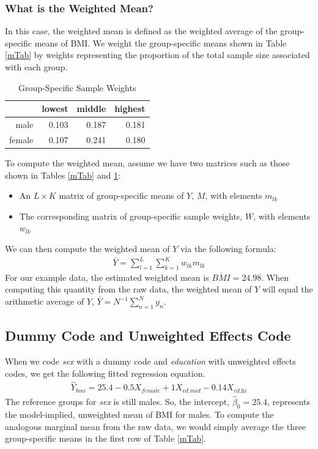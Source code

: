 \documentclass{article}\usepackage[]{graphicx}\usepackage[]{color}
\begin{document}
\subsubsection{What is the Weighted Mean?}
In this case, the weighted mean is defined as the weighted average of the
group-specific means of BMI. We weight the group-specific means shown in Table
\ref{mTab} by weights representing the proportion of the total sample size
associated with each group.

\begin{table}[ht]
\centering
\begin{tabular}{rrrr}
  \toprule
 & lowest & middle & highest \\ 
  \midrule
male & 0.103 & 0.187 & 0.181 \\ 
  female & 0.107 & 0.241 & 0.180 \\ 
   \bottomrule
\end{tabular}
\caption{Group-Specific Sample Weights} 
\label{wTab}
\end{table}


To compute the weighted mean, assume we have two matrices such as those shown in
Tables \ref{mTab} and \ref{wTab}:
\begin{itemize}
\item An $L \times K$ matrix of group-specific means of $Y$, $M$, with elements
  $m_{lk}$
\item The corresponding matrix of group-specific sample weights, $W$, with
  elements $w_{lk}$
\end{itemize}
We can then compute the weighted mean of $Y$ via the following formula:
\begin{align*}
  \bar{Y} = \sum_{l = 1}^L \sum_{k = 1}^K w_{lk} m_{lk}
\end{align*}
For our example data, the estimated weighted mean is $\overline{\textit{BMI}} =
24.98$. When computing this quantity from the raw
data, the weighted mean of $Y$ will equal the arithmetic average of $Y$,
$\bar{Y} = N^{-1} \sum_{n = 1}^N y_n$.

\subsection{Dummy Code and Unweighted Effects Code}



When we code \emph{sex} with a dummy code and \emph{education} with unweighted
effects codes, we get the following fitted regression equation.
\begin{align*}
  \hat{Y}_{\textit{bmi}} = 
  25.4
  -0.5X_{\textit{female}} + 
  1X_{\textit{ed.mid}} 
  -0.14X_{\textit{ed.hi}}
\end{align*}
The reference groups for \emph{sex} is still males. So, the intercept,
$\hat{\beta}_0 = 25.4$, represents the model-implied,
unweighted mean of BMI for males. To compute the analogous marginal mean from
the raw data, we would simply average the three group-specific means in the
first row of Table \ref{mTab}.
\end{document}
